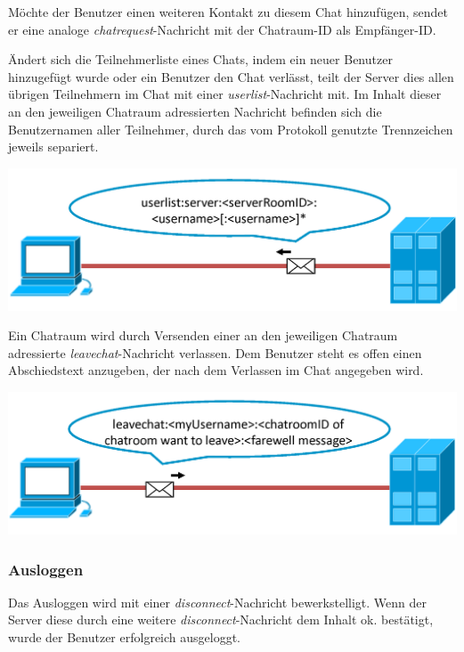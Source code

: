 \documentclass[12pt,a4paper,bibliography=totocnumbered,listof=totocnumbered]{scrartcl}
\begin{document}
Möchte der Benutzer einen weiteren Kontakt zu diesem Chat hinzufügen, sendet er eine analoge \textit{chatrequest}-Nachricht mit der Chatraum-ID als Empfänger-ID.

Ändert sich die Teilnehmerliste eines Chats, indem ein neuer Benutzer hinzugefügt wurde oder ein Benutzer den Chat verlässt, teilt der Server dies allen übrigen Teilnehmern im Chat mit einer \textit{userlist}-Nachricht mit. Im Inhalt dieser an den jeweiligen Chatraum adressierten Nachricht befinden sich die Benutzernamen aller Teilnehmer, durch das vom Protokoll genutzte Trennzeichen jeweils separiert.

\vspace{1em}
\begin{minipage}{\linewidth}
	\centering
	\includegraphics[width=0.7\linewidth]{img/userlist1.png}
	\label{fig:userlist1}
\end{minipage}
\vspace{0.5em}

Ein Chatraum wird durch Versenden einer an den jeweiligen Chatraum adressierte \textit{leavechat}-Nachricht verlassen. Dem Benutzer steht es offen einen Abschiedstext anzugeben, der nach dem Verlassen im Chat angegeben wird.

\vspace{1em}
\begin{minipage}{\linewidth}
	\centering
	\includegraphics[width=0.7\linewidth]{img/leavechat1.png}
	\label{fig:leavechat1}
\end{minipage}
\vspace{0.5em}


\subsubsection{Ausloggen}
Das Ausloggen wird mit einer \textit{disconnect}-Nachricht bewerkstelligt. Wenn der Server diese durch eine weitere \textit{disconnect}-Nachricht dem Inhalt \glqq ok\grqq{}. bestätigt, wurde der Benutzer erfolgreich ausgeloggt.
\end{document}
